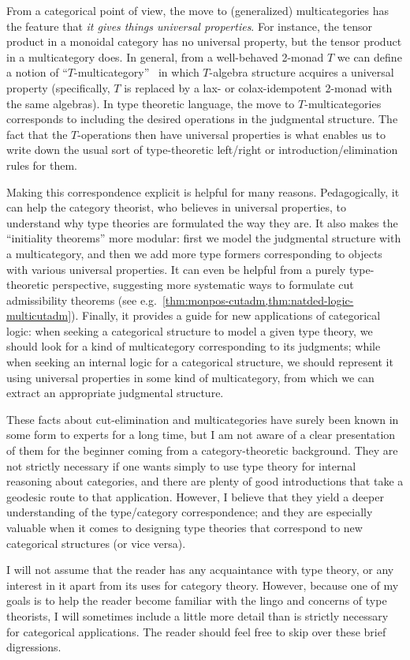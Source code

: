 From a categorical point of view, the move to (generalized) multicategories has the feature that \emph{it gives things universal properties}.
For instance, the tensor product in a monoidal category has no universal property, but the tensor product in a multicategory does.
In general, from a well-behaved 2-monad $T$ we can define a notion of ``$T$-multicategory''~\cite{burroni:t-cats,leinster:higher-opds,hermida:coh-univ,cs:multicats} in which $T$-algebra structure acquires a universal property (specifically, $T$ is replaced by a lax- or colax-idempotent 2-monad with the same algebras).
In type theoretic language, the move to $T$-multicategories corresponds to including the desired operations in the judgmental structure.
The fact that the $T$-operations then have universal properties is what enables us to write down the usual sort of type-theoretic left/right or introduction/elimination rules for them.

Making this correspondence explicit is helpful for many reasons.
Pedagogically, it can help the category theorist, who believes in universal properties, to understand why type theories are formulated the way they are.
It also makes the ``initiality theorems'' more modular: first we model the judgmental structure with a multicategory, and then we add more type formers corresponding to objects with various universal properties.
It can even be helpful from a purely type-theoretic perspective, suggesting more systematic ways to formulate cut admissibility theorems (see e.g.\ \cref{thm:monpos-cutadm,thm:natded-logic-multicutadm}). %
Finally, it provides a guide for new applications of categorical logic: when seeking a categorical structure to model a given type theory, we should look for a kind of multicategory corresponding to its judgments; while when seeking an internal logic for a categorical structure, we should represent it using universal properties in some kind of multicategory, from which we can extract an appropriate judgmental structure.

These facts about cut-elimination and multicategories have surely been known in some form to experts for a long time, but I am not aware of a clear presentation of them for the beginner coming from a category-theoretic background.
They are not strictly necessary if one wants simply to use type theory for internal reasoning about categories, and there are plenty of good introductions that take a geodesic route to that application.
However, I believe that they yield a deeper understanding of the type/category correspondence; and they are especially valuable when it comes to designing type theories that correspond to new categorical structures (or vice versa).

I will not assume that the reader has any acquaintance with type theory, or any interest in it apart from its uses for category theory.
However, because one of my goals is to help the reader become familiar with the lingo and concerns of type theorists, I will sometimes include a little more detail than is strictly necessary for categorical applications.
The reader should feel free to skip over these brief digressions.


